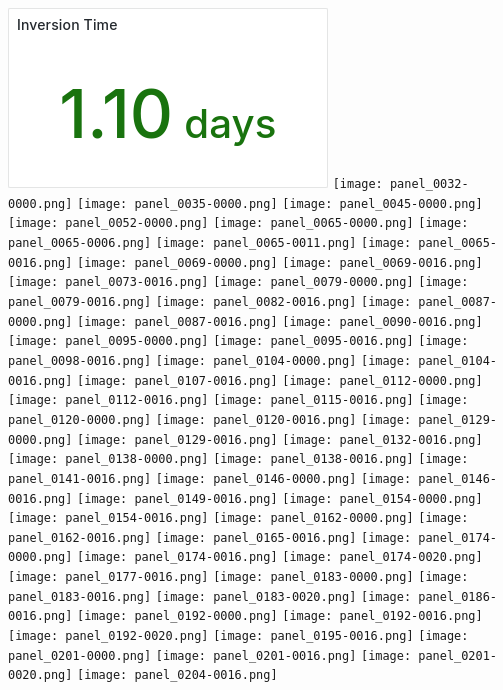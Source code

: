 \documentclass{article}
\begin{document}
\includegraphics[width=\textwidth]{panel_0028-0010.png}
\texttt{[image: panel\_0032-0000.png]}
\texttt{[image: panel\_0035-0000.png]}
\texttt{[image: panel\_0045-0000.png]}
\texttt{[image: panel\_0052-0000.png]}
\texttt{[image: panel\_0065-0000.png]}
\texttt{[image: panel\_0065-0006.png]}
\texttt{[image: panel\_0065-0011.png]}
\texttt{[image: panel\_0065-0016.png]}
\texttt{[image: panel\_0069-0000.png]}
\texttt{[image: panel\_0069-0016.png]}
\texttt{[image: panel\_0073-0016.png]}
\texttt{[image: panel\_0079-0000.png]}
\texttt{[image: panel\_0079-0016.png]}
\texttt{[image: panel\_0082-0016.png]}
\texttt{[image: panel\_0087-0000.png]}
\texttt{[image: panel\_0087-0016.png]}
\texttt{[image: panel\_0090-0016.png]}
\texttt{[image: panel\_0095-0000.png]}
\texttt{[image: panel\_0095-0016.png]}
\texttt{[image: panel\_0098-0016.png]}
\texttt{[image: panel\_0104-0000.png]}
\texttt{[image: panel\_0104-0016.png]}
\texttt{[image: panel\_0107-0016.png]}
\texttt{[image: panel\_0112-0000.png]}
\texttt{[image: panel\_0112-0016.png]}
\texttt{[image: panel\_0115-0016.png]}
\texttt{[image: panel\_0120-0000.png]}
\texttt{[image: panel\_0120-0016.png]}
\texttt{[image: panel\_0129-0000.png]}
\texttt{[image: panel\_0129-0016.png]}
\texttt{[image: panel\_0132-0016.png]}
\texttt{[image: panel\_0138-0000.png]}
\texttt{[image: panel\_0138-0016.png]}
\texttt{[image: panel\_0141-0016.png]}
\texttt{[image: panel\_0146-0000.png]}
\texttt{[image: panel\_0146-0016.png]}
\texttt{[image: panel\_0149-0016.png]}
\texttt{[image: panel\_0154-0000.png]}
\texttt{[image: panel\_0154-0016.png]}
\texttt{[image: panel\_0162-0000.png]}
\texttt{[image: panel\_0162-0016.png]}
\texttt{[image: panel\_0165-0016.png]}
\texttt{[image: panel\_0174-0000.png]}
\texttt{[image: panel\_0174-0016.png]}
\texttt{[image: panel\_0174-0020.png]}
\texttt{[image: panel\_0177-0016.png]}
\texttt{[image: panel\_0183-0000.png]}
\texttt{[image: panel\_0183-0016.png]}
\texttt{[image: panel\_0183-0020.png]}
\texttt{[image: panel\_0186-0016.png]}
\texttt{[image: panel\_0192-0000.png]}
\texttt{[image: panel\_0192-0016.png]}
\texttt{[image: panel\_0192-0020.png]}
\texttt{[image: panel\_0195-0016.png]}
\texttt{[image: panel\_0201-0000.png]}
\texttt{[image: panel\_0201-0016.png]}
\texttt{[image: panel\_0201-0020.png]}
\texttt{[image: panel\_0204-0016.png]}
\end{document}
